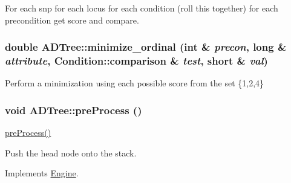 For each snp for each locus for each condition (roll this together) for each precondition get score and compare. \hypertarget{classADTree_af44335915afb5cde9d3dcd59ab5de99c}{
\subsubsection[{minimize\_\-ordinal}]{\setlength{\rightskip}{0pt plus 5cm}double ADTree::minimize\_\-ordinal (int \& {\em precon}, \/  long \& {\em attribute}, \/  {\bf Condition::comparison} \& {\em test}, \/  short \& {\em val})}}
\label{classADTree_af44335915afb5cde9d3dcd59ab5de99c}
Perform a minimization using each possible score from the set \{1,2,4\} \hypertarget{classADTree_a18b7ad4befedb9073a83c39106628d3b}{
\subsubsection[{preProcess}]{\setlength{\rightskip}{0pt plus 5cm}void ADTree::preProcess ()}}
\label{classADTree_a18b7ad4befedb9073a83c39106628d3b}
\hyperlink{classADTree_a18b7ad4befedb9073a83c39106628d3b}{preProcess()}

Push the head node onto the stack. 

Implements \hyperlink{classEngine_aec7076b8979a13c96eceb362437dc68c}{Engine}.

